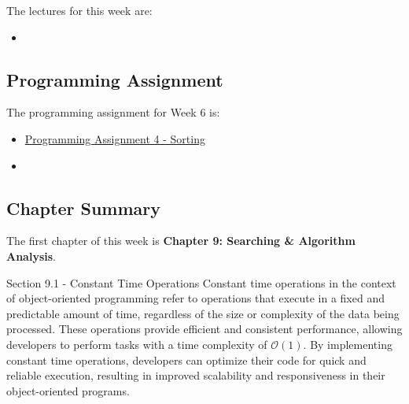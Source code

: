 \noindent The lectures for this week are:

\begin{itemize}
    \item {}
\end{itemize}

\subsection{Programming Assignment}

The programming assignment for Week 6 is:

\begin{itemize}
    \item \href{https://github.com/QuantumCompiler/CU/tree/main/CSPB%202270%20-%20Data%20Structures/Assignments/Assignment%204%20-%20Sorting%20Algorithms}{Programming Assignment 4 - Sorting}
    \item {}
\end{itemize}

\subsection{Chapter Summary}

The first chapter of this week is \textbf{Chapter 9: Searching \& Algorithm Analysis}.

\begin{notes}{Section 9.1 - Constant Time Operations}
    Constant time operations in the context of object-oriented programming refer to operations that execute in a fixed and predictable amount of time, regardless of the size or complexity of the data being processed. These operations provide efficient and consistent performance, allowing developers to perform tasks with a time complexity of $\mathcal{O}(1)$. 
    By implementing constant time operations, developers can optimize their code for quick and reliable execution, resulting in improved scalability and responsiveness in their object-oriented programs.
\end{notes}

